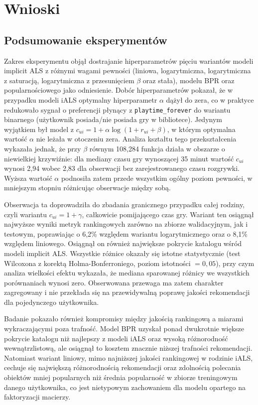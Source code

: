 \chapter{Wnioski}

\section{Podsumowanie eksperymentów}

Zakres eksperymentu objął dostrajanie hiperparametrów pięciu wariantów modeli implicit ALS z różnymi wagami pewności (liniowa, logarytmiczna, logarytmiczna z saturacją, logarytmiczna z przesunięciem $\beta$ oraz stała), modelu BPR oraz popularnościowego jako odniesienie. Dobór hiperparametrów pokazał, że w przypadku modeli iALS optymalny hiperparametr $\alpha$ dążył do zera, co w praktyce redukowało sygnał o preferencji płynący z \texttt{playtime\_forever} do wariantu binarnego (użytkownik posiada/nie posiada gry w bibliotece). Jedynym wyjątkiem był model z $c_{ui} = 1 + \alpha \log(1 + r_{ui} + \beta)$, w którym optymalna wartość $\alpha$ nie leżała w otoczeniu zera. Analiza kształtu tego przekształcenia wykazała jednak, że przy $\beta$ równym 108,284 funkcja działa w obszarze o niewielkiej krzywiźnie: dla mediany czasu gry wynoszącej 35 minut wartość $c_{ui}$ wynosi 2,94 wobec 2,83 dla obserwacji bez zarejestrowanego czasu rozgrywki. Wyższa wartość $\alpha$ podnosiła zatem przede wszystkim ogólny poziom pewności, w mniejszym stopniu różnicując obserwacje między sobą.

Obserwacja ta doprowadziła do zbadania granicznego przypadku całej rodziny, czyli wariantu $c_{ui} = 1 + \gamma$, całkowicie pomijającego czas gry. Wariant ten osiągnął najwyższe wyniki metryk rankingowych zarówno na zbiorze walidacyjnym, jak i testowym, poprawiając \ndcg{} o 6,2\% względem wariantu logarytmicznego oraz o 8,1\% względem liniowego. Osiągnął on również największe pokrycie katalogu wśród modeli implicit ALS. Wszystkie różnice okazały się istotne statystycznie (test Wilcoxona z korektą Holma-Bonferroniego, poziom istotności $= 0{,}05$), przy czym analiza wielkości efektu wykazała, że mediana sparowanej różnicy \ndcg{} we wszystkich porównaniach wynosi zero. Obserwowana przewaga ma zatem charakter zagregowany i nie przekłada się na przewidywalną poprawę jakości rekomendacji dla pojedynczego użytkownika.

Badanie pokazało również kompromisy między jakością rankingową a miarami wykraczającymi poza trafność. Model BPR uzyskał ponad dwukrotnie większe pokrycie katalogu niż najlepszy z modeli iALS oraz wysoką różnorodność wewnątrzlistową, ale osiągnął to kosztem znacznie niższej trafności rekomendacji. Natomiast wariant liniowy, mimo najniższej jakości rankingowej w rodzinie iALS, cechuje się największą różnorodnością rekomendacji oraz zdolnością polecania obiektów mniej popularnych niż średnia popularność w zbiorze treningowym danego użytkownika, co jest nietypowym zachowaniem dla modelu opartego na faktoryzacji macierzy.

